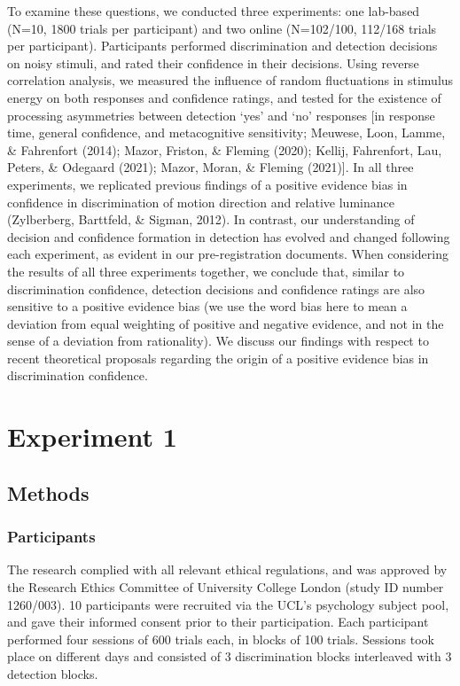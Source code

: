 \documentclass[12pt,twoside]{reedthesis}
\begin{document}
To examine these questions, we conducted three experiments: one lab-based (N=10, 1800 trials per participant) and two online (N=102/100, 112/168 trials per participant). Participants performed discrimination and detection decisions on noisy stimuli, and rated their confidence in their decisions. Using reverse correlation analysis, we measured the influence of random fluctuations in stimulus energy on both responses and confidence ratings, and tested for the existence of processing asymmetries between detection `yes' and `no' responses {[}in response time, general confidence, and metacognitive sensitivity; Meuwese, Loon, Lamme, \& Fahrenfort (2014); Mazor, Friston, \& Fleming (2020); Kellij, Fahrenfort, Lau, Peters, \& Odegaard (2021); Mazor, Moran, \& Fleming (2021){]}. In all three experiments, we replicated previous findings of a positive evidence bias in confidence in discrimination of motion direction and relative luminance (Zylberberg, Barttfeld, \& Sigman, 2012). In contrast, our understanding of decision and confidence formation in detection has evolved and changed following each experiment, as evident in our pre-registration documents. When considering the results of all three experiments together, we conclude that, similar to discrimination confidence, detection decisions and confidence ratings are also sensitive to a positive evidence bias (we use the word bias here to mean a deviation from equal weighting of positive and negative evidence, and not in the sense of a deviation from rationality). We discuss our findings with respect to recent theoretical proposals regarding the origin of a positive evidence bias in discrimination confidence.

\hypertarget{experiment-1-1}{%
\section{Experiment 1}\label{experiment-1-1}}

\hypertarget{methods}{%
\subsection{Methods}\label{methods}}

\hypertarget{participants-4}{%
\subsubsection{Participants}\label{participants-4}}

The research complied with all relevant ethical regulations, and was approved by the Research Ethics Committee of University College London (study ID number 1260/003). 10 participants were recruited via the UCL's psychology subject pool, and gave their informed consent prior to their participation. Each participant performed four sessions of 600 trials each, in blocks of 100 trials. Sessions took place on different days and consisted of 3 discrimination blocks interleaved with 3 detection blocks.
\end{document}
